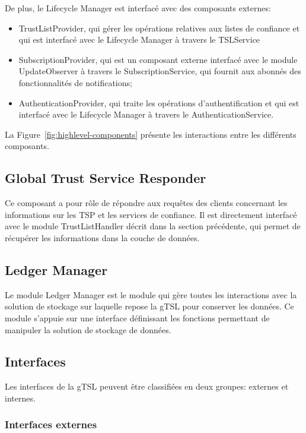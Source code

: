 \documentclass{tnreport}
\begin{document}
De plus, le Lifecycle Manager est interfacé avec des composants externes:
\begin{itemize}
	\item TrustListProvider, qui gérer les opérations relatives aux listes de confiance et qui est interfacé avec le Lifecycle Manager à travers le TSLService
	\item SubscriptionProvider, qui est un composant externe interfacé avec le module UpdateObserver à travers le SubscriptionService, qui fournit aux abonnés des fonctionnalités de notifications;
	\item AuthenticationProvider, qui traite les opérations d'authentification et qui est interfacé avec le Lifecycle Manager à travers le AuthenticationService.
	\newline
\end{itemize}

La Figure~\ref{fig:highlevel-components} présente les interactions entre les différents composants.

\subsection{Global Trust Service Responder}
Ce composant a pour rôle de répondre aux requêtes des clients concernant les informations sur les TSP et les services de confiance. Il est directement interfacé avec le module TrustListHandler décrit dans la section précédente, qui permet de récupérer les informations dans la couche de données.

\subsection{Ledger Manager}

Le module Ledger Manager est le module qui gère toutes les interactions avec la solution de stockage sur laquelle repose la gTSL pour conserver les données. Ce module s'appuie sur une interface définissant les fonctions permettant de manipuler la solution de stockage de données.

\subsection{Interfaces}

Les interfaces de la gTSL peuvent être classifiées en deux groupes: externes et internes.

\subsubsection{Interfaces externes}
\end{document}
